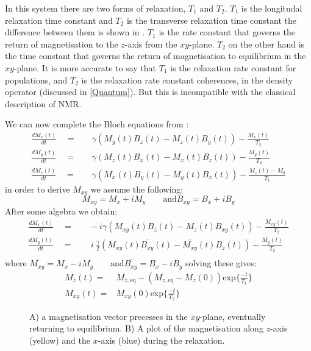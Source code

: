 In this system there are two forms of relaxation, $T_1$ and $T_2$. $T_1$ is the longitudal relaxation time
constant and $T_2$ is the transverse relaxation time constant the difference between them is shown in .
$T_1$ is the rate constant that governs the return of magnetisation to the $z$-axis from the $xy$-plane. $T_2$ on
the other hand is the time constant that governs the return of magnetisation to equilibrium in the $xy$-plane.
It is more accurate to say that $T_1$ is the relaxation rate constant for populations, and $T_2$ is the relaxation
rate constant coherences, in the density operator (discussed in \ref{Quantum}). But this is incompatible
with the classical description of NMR.

We can now complete the Bloch equations from :
\begin{align}
  \frac{dM_x(t)}{dt}\quad=&\quad\gamma(M_y(t)B_z(t)-M_z(t)B_y(t)) - \frac{M_x(t)}{T_2}\\
  \frac{dM_y(t)}{dt}\quad=&\quad\gamma(M_z(t)B_x(t)-M_x(t)B_z(t)) - \frac{M_y(t)}{T_2}\\
  \frac{dM_z(t)}{dt}\quad=&\quad\gamma(M_x(t)B_y(t)-M_y(t)B_x(t)) - \frac{M_z(t)-M_0}{T_1}
\end{align}
in order to derive $M_{xy}$ we assume the following:
\begin{equation}
  M_{xy} = M_x + iM_y\qquad\text{and} B_{xy} = B_x + iB_y
\end{equation}
After some algebra we obtain:
\begin{align}
  \frac{dM_x(t)}{dt}\quad=&\quad-i\gamma(M_{xy}(t)B_z(t)-M_z(t)B_{xy}(t)) - \frac{M_{xy}(t)}{T_2}\\
  \frac{dM_y(t)}{dt}\quad=&\quad~i~\frac{\gamma}{2}(M_{xy}(t)\overline{B_{xy}}(t)-\overline{M_{xy}}(t)B_z(t)) - \frac{M_y(t)}{T_2}\\
\end{align}
where $\overline{M_{xy}} = M_x - iM_y\qquad\text{and} \overline{B_{xy}} = B_x - iB_y$
solving these gives:
\begin{align}
  M_z(t) =& M_{z,\text{eq}} - (M_{z,\text{eq}}-M_z(0))\text{exp}\{\frac{-t}{T_1}\}\\
  M_{xy}(t) =& M_{xy}(0)\text{exp}\{\frac{-t}{T_2}\}
\end{align}

\begin{figure}[h]
  \caption{A) a magnetisation vector precesses in the $xy$-plane, eventually returning to equilibrium.
  B) A plot of the magnetisation along $z$-axis (yellow) and the $x$-axis (blue) during the relaxation.}
  \label{fig:t1t2}
\end{figure}

